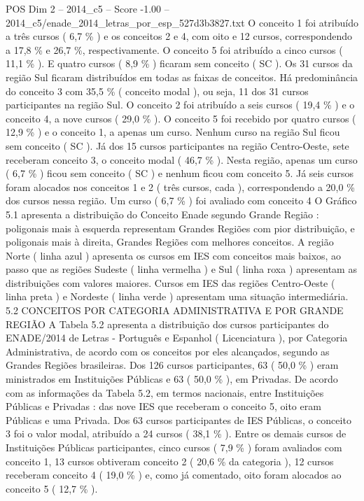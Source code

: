 \begin{textsample}{POS Dim 2 – 2014\_c5 – Score -1.00 – 2014\_c5/enade\_2014\_letras\_por\_esp\_527d3b3827.txt}
O conceito 1 foi atribuído a três cursos ( 6,7 \% ) e os conceitos 2 e 4, com oito e 12 cursos, correspondendo a 17,8 \% e 26,7 \%, respectivamente.
O conceito 5 foi atribuído a cinco cursos ( 11,1 \% ).
E quatro cursos ( 8,9 \% ) ficaram sem conceito ( SC ).
Os 31 cursos da região Sul ficaram distribuídos em todas as faixas de conceitos.
Há predominância do conceito 3 com 35,5 \% ( conceito modal ), ou seja, 11 dos 31 cursos participantes na região Sul.
O conceito 2 foi atribuído a seis cursos ( 19,4 \% ) e o conceito 4, a nove cursos ( 29,0 \% ).
O conceito 5 foi recebido por quatro cursos ( 12,9 \% ) e o conceito 1, a apenas um curso.
Nenhum curso na região Sul ficou sem conceito ( SC ).
Já dos 15 cursos participantes na região Centro-Oeste, sete receberam conceito 3, o conceito modal ( 46,7 \% ).
Nesta região, apenas um curso ( 6,7 \% ) ficou sem conceito ( SC ) e nenhum ficou com conceito 5.
Já seis cursos foram alocados nos conceitos 1 e 2 ( três cursos, cada ), correspondendo a 20,0 \% dos cursos nessa região.
Um curso ( 6,7 \% ) foi avaliado com conceito 4 O Gráfico 5.1 apresenta a distribuição do Conceito Enade segundo Grande Região : poligonais mais à esquerda representam Grandes Regiões com pior distribuição, e poligonais mais à direita, Grandes Regiões com melhores conceitos.
A região Norte ( linha azul ) apresenta os cursos em IES com conceitos mais baixos, ao passo que as regiões Sudeste ( linha vermelha ) e Sul ( linha roxa ) apresentam as distribuições com valores maiores.
Cursos em IES das regiões Centro-Oeste ( linha preta ) e Nordeste ( linha verde ) apresentam uma situação intermediária. 5.2 CONCEITOS POR CATEGORIA ADMINISTRATIVA E POR GRANDE REGIÃO A Tabela 5.2 apresenta a distribuição dos cursos participantes do ENADE/2014 de Letras - Português e Espanhol ( Licenciatura ), por Categoria Administrativa, de acordo com os conceitos por eles alcançados, segundo as Grandes Regiões brasileiras.
Dos 126 cursos participantes, 63 ( 50,0 \% ) eram ministrados em Instituições Públicas e 63 ( 50,0 \% ), em Privadas.
De acordo com as informações da Tabela 5.2, em termos nacionais, entre Instituições Públicas e Privadas : das nove IES que receberam o conceito 5, oito eram Públicas e uma Privada.
Dos 63 cursos participantes de IES Públicas, o conceito 3 foi o valor modal, atribuído a 24 cursos ( 38,1 \% ).
Entre os demais cursos de Instituições Públicas participantes, cinco cursos ( 7,9 \% ) foram avaliados com conceito 1, 13 cursos obtiveram conceito 2 ( 20,6 \% da categoria ), 12 cursos receberam conceito 4 ( 19,0 \% ) e, como já comentado, oito foram alocados ao conceito 5 ( 12,7 \% ).

\end{textsample}
